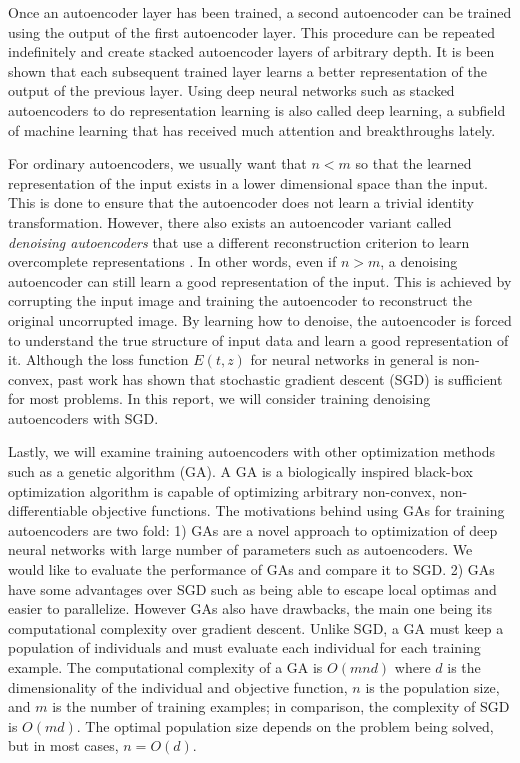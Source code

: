 Once an autoencoder layer has been trained, a second autoencoder can be trained using the output of the first autoencoder layer. This procedure can be repeated indefinitely and create stacked autoencoder layers of arbitrary depth. It is been shown that each subsequent trained layer learns a better representation of the output of the previous layer. Using deep neural networks such as stacked autoencoders to do representation learning is also called deep learning, a subfield of machine learning that has received much attention and breakthroughs lately. 

For ordinary autoencoders, we usually want that $n<m$ so that the learned representation of the input exists in a lower dimensional space than the input. This is done to ensure that the autoencoder does not learn a trivial identity transformation. However, there also exists an autoencoder variant called \textit{denoising autoencoders} that use a different reconstruction criterion to learn overcomplete representations \cite{vincent2010stacked}. In other words, even if $n>m$, a denoising autoencoder can still learn a good representation of the input. This is achieved by corrupting the input image and training the autoencoder to reconstruct the original uncorrupted image. By learning how to denoise, the autoencoder is forced to understand the true structure of input data and learn a good representation of it. Although the loss function $E(t,z)$ for neural networks in general is non-convex, past work has shown that stochastic gradient descent (SGD) is sufficient for most problems. In this report, we will consider training denoising autoencoders with SGD. 

Lastly, we will examine training autoencoders with other optimization methods such as a genetic algorithm (GA). A GA is a biologically inspired black-box optimization algorithm is capable of optimizing arbitrary non-convex, non-differentiable objective functions. The motivations behind using GAs for training autoencoders are two fold: 1) GAs are a novel approach to optimization of deep neural networks with large number of parameters such as autoencoders. We would like to evaluate the performance of GAs and compare it to SGD. 2) GAs have some advantages over SGD such as being able to escape local optimas and easier to parallelize. However GAs also have drawbacks, the main one being its computational complexity over gradient descent. Unlike SGD, a GA must keep a population of individuals and must evaluate each individual for each training example. The computational complexity of a GA is $O(mnd)$ where $d$ is the dimensionality of the individual and objective function, $n$ is the population size, and $m$ is the number of training examples; in comparison, the complexity of SGD is $O(md)$. The optimal population size depends on the problem being solved, but in most cases, $n=O(d)$. 

